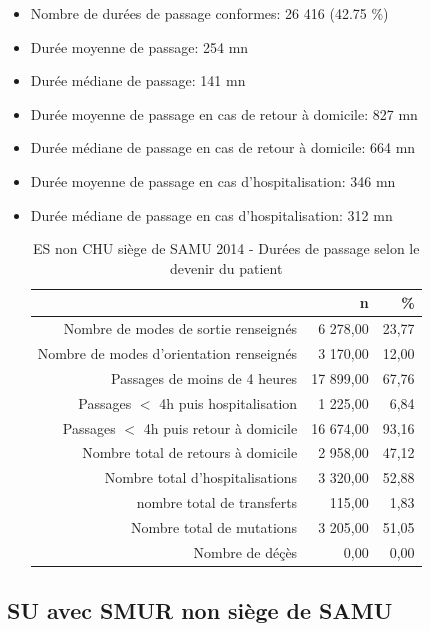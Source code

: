 \documentclass[]{article}
\begin{document}
\begin{itemize}
\itemsep1pt\parskip0pt
\item
  Nombre de durées de passage conformes: 26 416 (42.75 \%)
\item
  Durée moyenne de passage: 254 mn
\item
  Durée médiane de passage: 141 mn
\item
  Durée moyenne de passage en cas de retour à domicile: 827 mn
\item
  Durée médiane de passage en cas de retour à domicile: 664 mn
\item
  Durée moyenne de passage en cas d'hospitalisation: 346 mn
\item
  Durée médiane de passage en cas d'hospitalisation: 312 mn

  \begin{table}[ht]
  \centering
  \begin{tabular}{rrr}
    \hline
   & n & \% \\ 
    \hline
  Nombre de modes de sortie renseignés & 6 278,00 & 23,77 \\ 
    Nombre de modes d'orientation renseignés & 3 170,00 & 12,00 \\ 
    Passages de moins de 4 heures & 17 899,00 & 67,76 \\ 
    Passages $<$ 4h puis hospitalisation & 1 225,00 & 6,84 \\ 
    Passages $<$ 4h puis retour à domicile & 16 674,00 & 93,16 \\ 
    Nombre total de retours à domicile & 2 958,00 & 47,12 \\ 
    Nombre total d'hospitalisations & 3 320,00 & 52,88 \\ 
    nombre total de transferts & 115,00 & 1,83 \\ 
    Nombre total de mutations & 3 205,00 & 51,05 \\ 
    Nombre de déçès & 0,00 & 0,00 \\ 
     \hline
  \end{tabular}
  \caption{ES non CHU siège de SAMU 2014 - Durées de passage selon le devenir du patient} 
  \end{table}
\end{itemize}

\subsection{SU avec SMUR non siège de
SAMU}\label{su-avec-smur-non-siege-de-samu}
\end{document}
